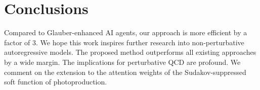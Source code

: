 \section{Conclusions}\label{sec:conclusions}

Compared to Glauber-enhanced AI agents, our approach is more efficient
by a factor of 3. We hope this work inspires further research into
non-perturbative autoregressive models. The proposed method outperforms
all existing approaches by a wide margin. The implications for
perturbative QCD are profound. We comment on the extension to the
attention weights of the Sudakov-suppressed soft function of
photoproduction.

